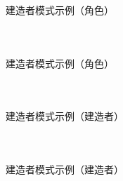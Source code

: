 \documentclass[UTF8,aspectratio=169]{beamer}
\begin{document}
\begin{frame}{建造者模式示例（角色）}
    \begin{columns}
        \begin{column}{0.48\textwidth}
            \inputminted[firstline=63, lastline=82]{cpp}{code/builder_pattern.cpp}
        \end{column}
        \begin{column}{0.48\textwidth}
            \inputminted[firstline=84, lastline=99]{cpp}{code/builder_pattern.cpp}
        \end{column}
    \end{columns}
\end{frame}

\begin{frame}{建造者模式示例（角色）}
    \begin{columns}
        \begin{column}{0.48\textwidth}
            \inputminted[firstline=101, lastline=115]{cpp}{code/builder_pattern.cpp}
        \end{column}
        \begin{column}{0.48\textwidth}
            \inputminted[firstline=117, lastline=131]{cpp}{code/builder_pattern.cpp}
        \end{column}
    \end{columns}
\end{frame}

\begin{frame}{建造者模式示例（建造者）}
    \begin{columns}
        \begin{column}{0.48\textwidth}
            \inputminted[firstline=133, lastline=143]{cpp}{code/builder_pattern.cpp}
        \end{column}
        \begin{column}{0.48\textwidth}
            \inputminted[firstline=145, lastline=162]{cpp}{code/builder_pattern.cpp}
        \end{column}
    \end{columns}
\end{frame}

\begin{frame}{建造者模式示例（建造者）}
    \begin{columns}
        \begin{column}{0.48\textwidth}
            \inputminted[firstline=164, lastline=180]{cpp}{code/builder_pattern.cpp}
        \end{column}
        \begin{column}{0.48\textwidth}
            \inputminted[firstline=182, lastline=199]{cpp}{code/builder_pattern.cpp}
        \end{column}
    \end{columns}
\end{frame}
\end{document}
